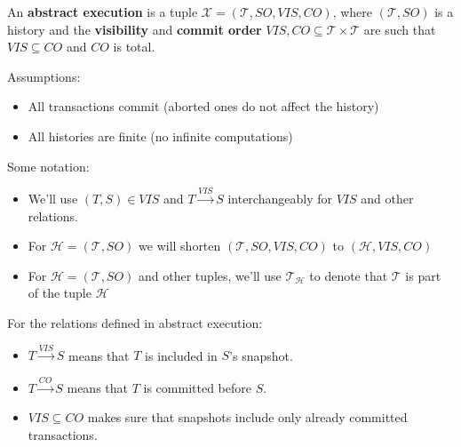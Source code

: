 \documentclass{beamer}
\begin{document}
\begin{frame}
	\begin{definition}
		An \textbf{abstract execution} is a tuple $ \mathcal{X} = (\mathcal{T}, SO, VIS, CO) $, where $(\mathcal{T}, SO)$ is a history and the \textbf{visibility} and \textbf{commit order} $ VIS, CO \subseteq \mathcal{T} \times \mathcal{T} $ are such that $ VIS \subseteq CO $ and $CO$ is total.
	\end{definition}
	Assumptions:
	\begin{itemize}
		\item All transactions commit (aborted ones do not affect the history)
		\item All histories are finite (no infinite computations)
	\end{itemize}
\end{frame}

\begin{frame}
	Some notation:
	\begin{itemize}
		\item We'll use $ (T, S) \in VIS$ and $ T \xrightarrow{VIS} S $ interchangeably for $VIS$ and other relations.
		\item For $\mathcal{H}=(\mathcal{T}, SO)$ we will shorten $(\mathcal{T}, SO, VIS, CO)$ to $(\mathcal{H}, VIS, CO)$
		\item For $\mathcal{H}=(\mathcal{T}, SO)$ and other tuples, we'll use $\mathcal{T}_\mathcal{H}$ to denote that $\mathcal{T}$ is part of the tuple $\mathcal{H}$
	\end{itemize}
\end{frame}

\begin{frame}
	For the relations defined in abstract execution:
	\begin{itemize}
		\item $ T \xrightarrow{VIS} S $ means that $T$ is included in $S$'s snapshot.
		\item $ T \xrightarrow{CO} S $ means that $T$ is committed before $S$.
		\item $ VIS \subseteq CO $ makes sure that snapshots include only already committed transactions.
	\end{itemize}
\end{frame}
\end{document}
